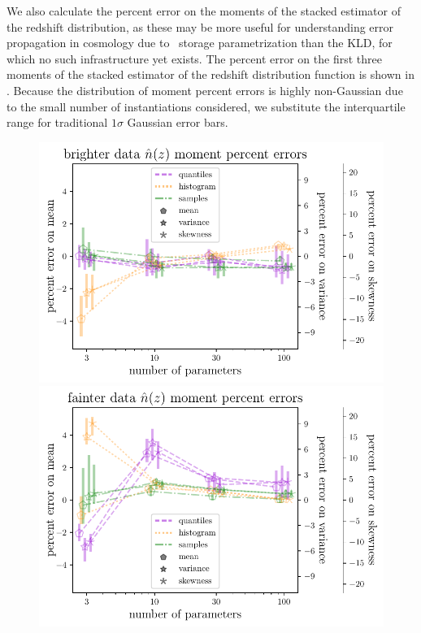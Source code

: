 We also calculate the percent error on the moments of the stacked estimator of 
the redshift distribution, as these may be more useful for understanding error 
propagation in cosmology due to \pz\ storage parametrization than the KLD, for 
which no such infrastructure yet exists.
The percent error on the first three moments of the stacked estimator of the 
redshift distribution function is shown in .
Because the distribution of moment percent errors is highly non-Gaussian due to 
the small number of instantiations considered, we substitute the interquartile 
range for traditional $1\sigma$ Gaussian error bars.
\begin{figure}
	\begin{center}
		\includegraphics[width=\columnwidth]{figures/qp/graham_nz_err.pdf}    
		\includegraphics[width=\columnwidth]{figures/qp/schmidt_nz_err.pdf}

\end{center}
\end{figure}
